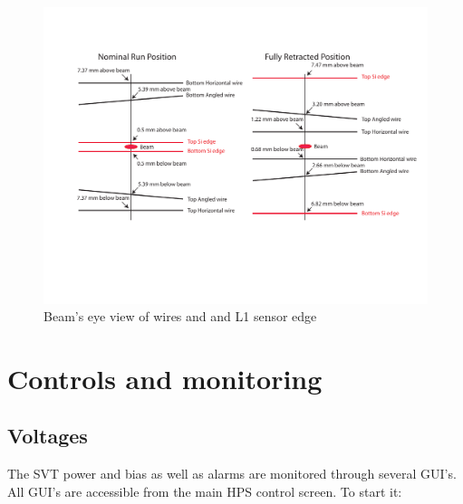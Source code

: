 \documentclass[12pt]{report}
\begin{document}
\begin{figure}[ht!]
\centering
\includegraphics[width=15cm]{WireFrame2.pdf}
\caption{Beam's eye view of wires and and L1 sensor edge}
\label{fig:beam}
\end{figure}




\chapter{Controls and monitoring}

\section{Voltages}
\label{sec:monitoring_power}
The SVT power and bias as well as alarms are monitored through several GUI's. All GUI's are accessible from the main HPS control screen. To start it:
\end{document}
